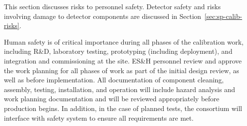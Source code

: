 

This section discusses risks to personnel safety. Detector safety and risks involving damage to detector components are discussed in Section~\ref{sec:sp-calib-risks}.

Human safety is of critical importance during all phases of the calibration work, including R\&D, laboratory testing, prototyping (including  deployment), and integration and commissioning at the   site.  ES\&H personnel review and approve the work planning for all phases of work as part of the initial design review, as well as before implementation. All documentation of component cleaning, assembly, testing, installation, and operation will include hazard analysis and work planning documentation and will be reviewed appropriately before production begins. In addition, in the case of planned  tests, the consortium will interface with  safety system to ensure all requirements are met.


